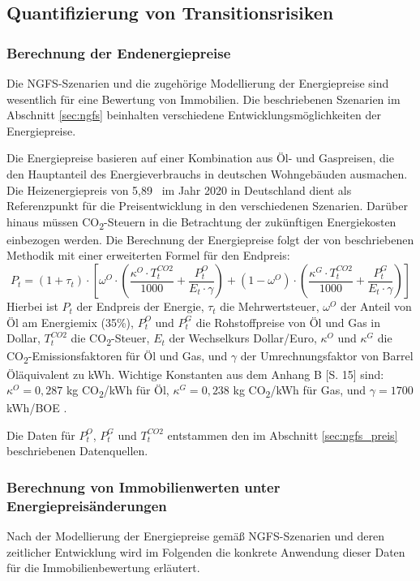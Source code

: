 \subsection{Quantifizierung von Transitionsrisiken}
\subsubsection{Berechnung der Endenergiepreise}
Die \ac{NGFS}-Szenarien und die zugehörige Modellierung der Energiepreise sind wesentlich für eine Bewertung von Immobilien. Die beschriebenen Szenarien im Abschnitt \ref{sec:ngfs} beinhalten verschiedene Entwicklungsmöglichkeiten der Energiepreise.

Die Energiepreise basieren auf einer Kombination aus Öl- und Gaspreisen, die den Hauptanteil des Energieverbrauchs in deutschen Wohngebäuden ausmachen. Die Heizenergiepreis von 5,89~ im Jahr 2020 in Deutschland \parencite{behr2023warmemonitor} dient als Referenzpunkt für die Preisentwicklung in den verschiedenen Szenarien. Darüber hinaus müssen CO\textsubscript{2}-Steuern in die Betrachtung der zukünftigen Energiekosten einbezogen werden. Die Berechnung der Energiepreise folgt der von \textcite{tergerman} beschriebenen Methodik mit einer erweiterten Formel für den Endpreis:
\begin{equation}\label{eq:pt}
P_t = (1 + \tau_t) \cdot [\omega^O \cdot (\frac{\kappa^O \cdot T^{CO2}_t}{1000} + \frac{P^O_t}{E_t \cdot \gamma}) + (1 - \omega^O) \cdot (\frac{\kappa^G \cdot T^{CO2}_t}{1000} + \frac{P^G_t}{E_t \cdot \gamma})]
\end{equation}
Hierbei ist $P_t$ der Endpreis der Energie, $\tau_t$ die Mehrwertsteuer, $\omega^O$ der Anteil von Öl am Energiemix (35\%), $P^O_t$ und $P^G_t$ die Rohstoffpreise von Öl und Gas in Dollar, $T^{CO2}_t$ die CO\textsubscript{2}-Steuer, $E_t$ der Wechselkurs Dollar/Euro, $\kappa^O$ und $\kappa^G$ die CO\textsubscript{2}-Emissionsfaktoren für Öl und Gas, und $\gamma$ der Umrechnungsfaktor von Barrel Öläquivalent zu kWh. Wichtige Konstanten aus dem Anhang B [S. 15] sind: $\kappa^O = 0,287$ kg CO\textsubscript{2}/kWh für Öl, $\kappa^G = 0,238$ kg CO\textsubscript{2}/kWh für Gas, und $\gamma = 1700$ kWh/BOE \parencite{tergerman}. 

Die Daten für $P^O_t$, $P^G_t$ und $T^{CO2}_t$ entstammen den im Abschnitt \ref{sec:ngfs_preis} beschriebenen Datenquellen.

\subsubsection{Berechnung von Immobilienwerten unter Energiepreisänderungen}\label{sec:endenfkt}
Nach der Modellierung der Energiepreise gemäß NGFS-Szenarien und deren zeitlicher Entwicklung wird im Folgenden die konkrete Anwendung dieser Daten für die Immobilienbewertung erläutert.

